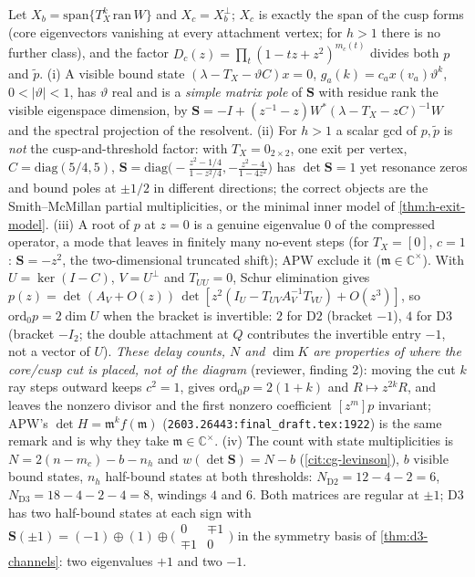 \begin{proposition}
\label{prop:multi-exit-spectrum}
Let $X_b = \mathrm{span}\{T_X^k\,\mathrm{ran}\,W\}$ and $X_c = X_b^\perp$; $X_c$ is exactly the span of the
cusp forms (core eigenvectors vanishing at every attachment vertex; for $h>1$ there is no further class),
and the factor $D_c(z) = \prod_t(1-tz+z^2)^{m_c(t)}$ divides both $p$ and $\tilde p$. (i) A visible bound
state $(\lambda-T_X-\vartheta C)x = 0$, $g_a(k) = c_ax(v_a)\vartheta^k$, $0<|\vartheta|<1$, has $\vartheta$ real and is a
\emph{simple matrix pole} of $\mathbf S$ with residue rank the visible eigenspace dimension, by
$\mathbf S = -I+(z^{-1}-z)W^{*}(\lambda-T_X-zC)^{-1}W$ and the spectral projection of the resolvent. (ii) For
$h>1$ a scalar gcd of $p,\tilde p$ is \emph{not} the cusp-and-threshold factor: with $T_X = 0_{2\times2}$, one
exit per vertex, $C = \mathrm{diag}(5/4,5)$, $\mathbf S = \mathrm{diag}\big(-\tfrac{z^2-1/4}{1-z^2/4},
-\tfrac{z^2-4}{1-4z^2}\big)$ has $\det\mathbf S = 1$ yet resonance zeros and bound poles at $\pm1/2$ in
different directions; the correct objects are the Smith--McMillan partial multiplicities, or the minimal
inner model of \cref{thm:h-exit-model}. (iii) A root of $p$ at $z = 0$ is a genuine eigenvalue $0$ of the
compressed operator, a mode that leaves in finitely many no-event steps (for $T_X = [0]$, $c = 1$:
$\mathbf S = -z^2$, the two-dimensional truncated shift); APW exclude it ($\mathfrak m\in\mathbb C^\times$). With
$U = \ker(I-C)$, $V = U^\perp$ and $T_{UU} = 0$, Schur elimination gives $p(z) = \det(A_V+O(z))\,
\det[z^2(I_U-T_{UV}A_V^{-1}T_{VU})+O(z^3)]$, so $\mathrm{ord}_0p = 2\dim U$ when the bracket is invertible:
$2$ for $\mathrm{D2}$ (bracket $-1$), $4$ for $\mathrm{D3}$ (bracket $-I_2$; the double attachment at $Q$
contributes the invertible entry $-1$, not a vector of $U$). \emph{These delay counts, $N$ and $\dim K$ are properties of
where the core/cusp cut is placed, not of the diagram} (reviewer, finding 2): moving the cut $k$ ray steps outward keeps
$c^2 = 1$, gives $\mathrm{ord}_0p = 2(1+k)$ and $R\mapsto z^{2k}R$, and leaves the nonzero divisor and the first nonzero
coefficient $[z^m]p$ invariant; APW's $\det H = \mathfrak m^kf(\mathfrak m)$ (\texttt{2603.26443:final\_draft.tex:1922}) is
the same remark and is why they take $\mathfrak m\in\mathbb C^\times$. (iv) The count with state multiplicities is
$N = 2(n-m_c)-b-n_h$ and $w(\det\mathbf S) = N-b$ (\cref{cit:cg-levinson}), $b$ visible bound states, $n_h$
half-bound states at both thresholds: $N_{\mathrm{D2}} = 12-4-2 = 6$, $N_{\mathrm{D3}} = 18-4-2-4 = 8$,
windings $4$ and $6$. Both matrices are regular at $\pm1$; $\mathrm{D3}$ has two half-bound states at each
sign with $\mathbf S(\pm1) = (-1)\oplus(1)\oplus\big(\begin{smallmatrix}0&\mp1\\\mp1&0\end{smallmatrix}\big)$
in the symmetry basis of \cref{thm:d3-channels}: two eigenvalues $+1$ and two $-1$.
\end{proposition}

